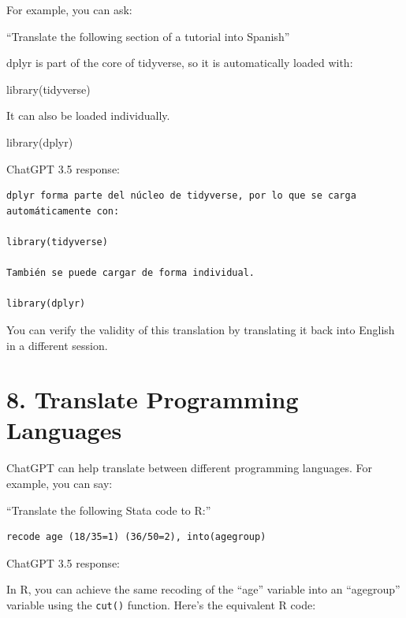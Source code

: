 \documentclass[
  letterpaper,
  DIV=11,
  numbers=noendperiod]{scrreprt}
\newenvironment{Shaded}{\begin{snugshade}}{\end{snugshade}}
\newcommand{\AttributeTok}[1]{\textcolor[rgb]{0.40,0.45,0.13}{#1}}
\newcommand{\ConstantTok}[1]{\textcolor[rgb]{0.56,0.35,0.01}{#1}}
\newcommand{\DecValTok}[1]{\textcolor[rgb]{0.68,0.00,0.00}{#1}}
\newcommand{\DocumentationTok}[1]{\textcolor[rgb]{0.37,0.37,0.37}{\textit{#1}}}
\newcommand{\FunctionTok}[1]{\textcolor[rgb]{0.28,0.35,0.67}{#1}}
\newcommand{\NormalTok}[1]{\textcolor[rgb]{0.00,0.23,0.31}{#1}}
\newcommand{\OtherTok}[1]{\textcolor[rgb]{0.00,0.23,0.31}{#1}}
\newcommand{\SpecialCharTok}[1]{\textcolor[rgb]{0.37,0.37,0.37}{#1}}
\begin{document}
For example, you can ask:

``Translate the following section of a tutorial into Spanish''

\begin{Shaded}
\begin{Highlighting}[]
\NormalTok{dplyr is part of the core of tidyverse, so it is automatically loaded with}\SpecialCharTok{:}

\FunctionTok{library}\NormalTok{(tidyverse)}

\NormalTok{It can also be loaded individually.}

\FunctionTok{library}\NormalTok{(dplyr)}
\end{Highlighting}
\end{Shaded}

ChatGPT 3.5 response:

\hypertarget{chatgpt}{}
\begin{verbatim}
dplyr forma parte del núcleo de tidyverse, por lo que se carga automáticamente con:

library(tidyverse)

También se puede cargar de forma individual.

library(dplyr)
\end{verbatim}

You can verify the validity of this translation by translating it back
into English in a different session.

\hypertarget{translate-programming-languages}{%
\section{8. Translate Programming
Languages}\label{translate-programming-languages}}

ChatGPT can help translate between different programming languages. For
example, you can say:

``Translate the following Stata code to R:''

\begin{verbatim}
recode age (18/35=1) (36/50=2), into(agegroup)
\end{verbatim}

ChatGPT 3.5 response:

\leavevmode{}%
In R, you can achieve the same recoding of the ``age'' variable into an
``agegroup'' variable using the \texttt{cut()} function. Here's the
equivalent R code:

\begin{Shaded}
\end{Shaded}
\end{document}

